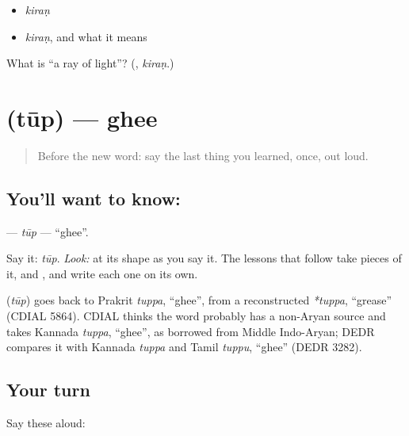 \begin{itemize}
\raggedright
  \item \emph{kiraṇ}
  \item \emph{kiraṇ}, and what it means
\end{itemize}

\begin{tcolorbox}[breakable,colback=teal!4,colframe=teal!35!black,title={Before you move on}]
What is \textquotedblleft{}a ray of light\textquotedblright{}? (\textbf{}, \emph{kiraṇ}.)
\end{tcolorbox}
\section[\texorpdfstring{\mr{तूप} (tūp)}{तूप (tūp)}]{ (tūp) — ghee}

\label{lesson:MR-C05-tup}



\begin{quote}
Before the new word: say the last thing you learned, once, out loud.
\end{quote}

\subsection*{You'll want to know: }
\textbf{} — \emph{tūp} — \textquotedblleft{}ghee\textquotedblright{}.

Say it: \emph{tūp}. \emph{Look:} at its shape as you say it. The lessons that follow take pieces of it, \textbf{} and \textbf{}, and write each one on its own.

\begin{cousinweb}
\textbf{} (\emph{tūp}) goes back to Prakrit \emph{tuppa}, \textquotedblleft{}ghee\textquotedblright{}, from a reconstructed \emph{*tuppa}, \textquotedblleft{}grease\textquotedblright{} (CDIAL 5864). CDIAL thinks the word probably has a non-Aryan source and takes Kannada \emph{tuppa}, \textquotedblleft{}ghee\textquotedblright{}, as borrowed from Middle Indo-Aryan; DEDR compares it with Kannada \emph{tuppa} and Tamil \emph{tuppu}, \textquotedblleft{}ghee\textquotedblright{} (DEDR 3282).
\end{cousinweb}

\subsection*{Your turn}
Say these aloud:

